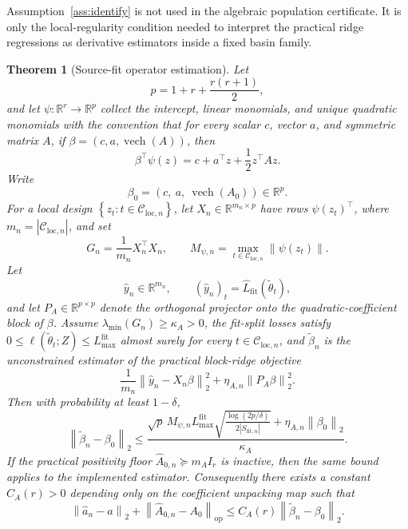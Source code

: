 \documentclass{article}
\newtheorem{theorem}{Theorem}
\newcommand{\RR}{\mathbb{R}}
\newcommand{\cC}{\mathcal{C}}
\newcommand{\loss}{\ell}
\newcommand{\norm}[1]{\left\lVert #1 \right\rVert}
\newcommand{\abs}[1]{\left\lvert #1 \right\rvert}
\newcommand{\paren}[1]{\left( #1 \right)}
\newcommand{\braces}[1]{\left\{ #1 \right\}}
\begin{document}
Assumption~\ref{ass:identify} is not used in the algebraic population certificate. It is only the local-regularity condition needed to interpret the practical ridge regressions as derivative estimators inside a fixed basin family.

\begin{theorem}[Source-fit operator estimation]
\label{thm:A_est}
Let
\[
p = 1 + r + \frac{r(r+1)}{2},
\]
and let \(\psi:\RR^r\to\RR^p\) collect the intercept, linear monomials, and unique quadratic monomials with the convention that for every scalar \(c\), vector \(a\), and symmetric matrix \(A\), if \(\beta=(c,a,\operatorname{vech}(A))\), then
\[
\beta^\top \psi(z)=c+a^\top z+\frac12 z^\top A z.
\]
Write
\[
\beta_0 = \paren{c,\ a,\ \operatorname{vech}(A_0)} \in \RR^p.
\]
For a local design \(\braces{z_t : t\in\cC_{\mathrm{loc},n}}\), let \(X_n\in\RR^{m_n\times p}\) have rows \(\psi(z_t)^\top\), where \(m_n=\abs{\cC_{\mathrm{loc},n}}\), and set
\[
G_n = \frac{1}{m_n} X_n^\top X_n,
\qquad
M_{\psi,n} = \max_{t\in\cC_{\mathrm{loc},n}} \norm{\psi(z_t)}.
\]
Let
\[
\hat y_n\in\RR^{m_n},
\qquad
(\hat y_n)_t=\widehat L_{\mathrm{fit}}(\tilde\theta_t),
\]
and let \(P_A\in\RR^{p\times p}\) denote the orthogonal projector onto the quadratic-coefficient block of \(\beta\). Assume \(\lambda_{\min}(G_n)\ge \kappa_A>0\), the fit-split losses satisfy \(0\le \loss(\tilde\theta_t;Z)\le L_{\max}^{\mathrm{fit}}\) almost surely for every \(t\in\cC_{\mathrm{loc},n}\), and \(\tilde\beta_n\) is the unconstrained estimator of the practical block-ridge objective
\[
\frac{1}{m_n}\norm{\hat y_n-X_n\beta}_2^2+\eta_{A,n}\norm{P_A\beta}_2^2.
\]
Then with probability at least \(1-\delta\),
\[
\norm{\tilde\beta_n-\beta_0}_2
\le
\frac{
\sqrt{p}\,M_{\psi,n} L_{\max}^{\mathrm{fit}}
\sqrt{\frac{\log(2p/\delta)}{2\abs{S_{\mathrm{fit},n}}}}
+
\eta_{A,n}\norm{\beta_0}_2
}{\kappa_A}.
\]
If the practical positivity floor \(\hat A_{0,n}\succeq m_A I_r\) is inactive, then the same bound applies to the implemented estimator. Consequently there exists a constant \(C_A(r)>0\) depending only on the coefficient unpacking map such that
\[
\norm{\hat a_n-a}_2 + \norm{\hat A_{0,n}-A_0}_{\mathrm{op}}
\le
C_A(r)\norm{\tilde\beta_n-\beta_0}_2.
\]
\end{theorem}
\end{document}

